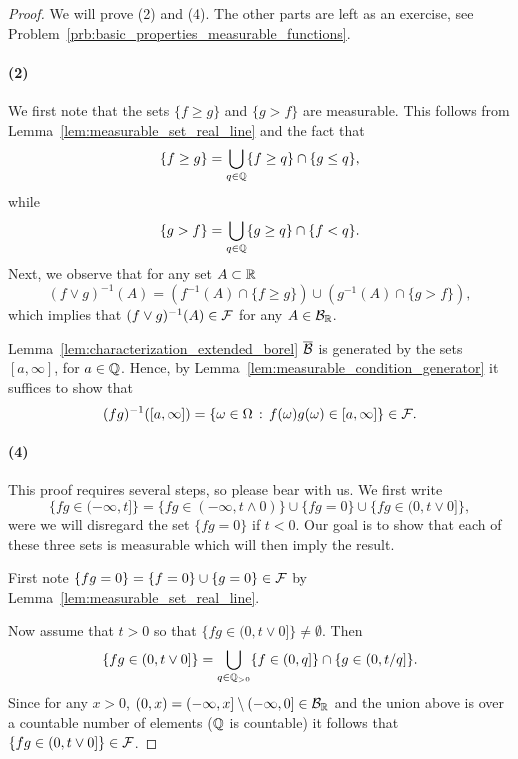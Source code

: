 \begin{proof}
We will prove (2) and (4). The other parts are left as an exercise, see Problem~\ref{prb:basic_properties_measurable_functions}.

\paragraph{(2)} We first note that the sets $\{f \ge g\}$ and $\{g > f\}$ are measurable. This follows from Lemma~\ref{lem:measurable_set_real_line} and the fact that
\[
	\{f \ge g\} = \bigcup_{q \in \mathbb Q} \{f \ge q\} \cap \{g \le q\},
\]
while
\[
	\{g > f\} = \bigcup_{q \in \mathbb Q} \{g \ge q\} \cap \{f < q\}.
\]
Next, we observe that for any set $A \subset \mathbb R$
\[
	(f \vee g)^{-1}(A) = \left(f^{-1}(A) \cap \{f \ge g\}\right) \cup \left(g^{-1}(A) \cap \{g > f\}\right),
\]
which implies that $(f \vee g)^{-1}(A) \in \mathcal F$ for any $A \in \mathcal B_{\mathbb R}$.

Lemma~\ref{lem:characterization_extended_borel} $\overline{\mathcal B}$ is generated by the sets $[a,\infty]$, for $a \in \mathbb Q$. Hence, by Lemma~\ref{lem:measurable_condition_generator} it suffices to show that 
\[
	(fg)^{-1}([a,\infty]) = \{\omega \in \Omega \, : \, f(\omega) g(\omega) \in [a, \infty]\} \in \mathcal F.
\]

\paragraph{(4)} This proof requires several steps, so please bear with us. We first write
\[
	\{fg \in (-\infty, t]\} = \{fg \in (-\infty, t \wedge 0)\} \cup \{fg = 0\} \cup \{fg \in (0,t \vee 0]\},
\]
were we will disregard the set $\{fg = 0\}$ if $t < 0$. Our goal is to show that each of these three sets is measurable which will then imply the result.

First note $\{fg = 0\} = \{f = 0\} \cup \{g = 0\} \in \mathcal F$ by Lemma~\ref{lem:measurable_set_real_line}.

Now assume that $t > 0$ so that $\{fg \in (0,t \vee 0]\} \ne \emptyset$. Then
\[
	\{fg \in (0,t \vee 0]\} = \bigcup_{q \in \mathbb Q_{>0}} \{f \in (0,q]\} \cap \{g \in (0,t/q]\}.
\]
Since for any $x >0$, $(0,x) = (-\infty,x] \setminus (-\infty,0] \in \mathcal B_{\mathbb R}$ and the union above is over a countable number of elements ($\mathbb Q$ is countable) it follows that $\{fg \in (0,t \vee 0]\} \in \mathcal F$.


\end{proof}
